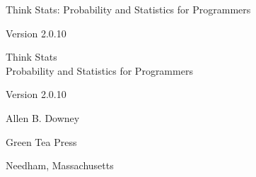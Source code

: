 \documentclass[12pt]{book}
\newcommand{\theversion}{2.0.10}
\begin{document}
\begin{latexonly}

\renewcommand{\blankpage}{\thispagestyle{empty} \quad \newpage}



\thispagestyle{empty}

\begin{flushright}
\vspace*{2.0in}

\begin{spacing}{3}
{\huge Think Stats: Probability and Statistics for Programmers}\\
{\Large }
\end{spacing}

\vspace{0.25in}

Version \theversion

\vfill

\end{flushright}


\blankpage
\blankpage

\pagebreak
\thispagestyle{empty}

\begin{flushright}
\vspace*{2.0in}

\begin{spacing}{3}
{\huge Think Stats}\\
{\Large Probability and Statistics for Programmers}
\end{spacing}

\vspace{0.25in}

Version \theversion

\vspace{1in}


{\Large
Allen B. Downey\\
}


\vspace{0.5in}

{\Large Green Tea Press}

{\small Needham, Massachusetts}


\end{flushright}
\end{latexonly}
\end{document}
